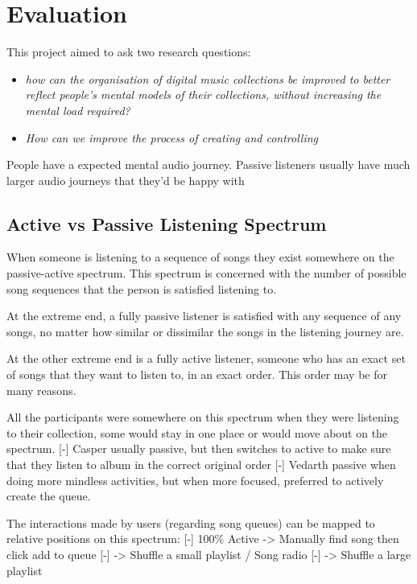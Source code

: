 \chapter{Evaluation}
This project aimed to ask two research questions:\begin{itemize}
    \item \textit{how can the organisation of digital music collections be improved to better reflect people's mental models of their collections, without increasing the mental load required?}
    \item \textit{How can we improve the process of creating and controlling}
\end{itemize}

People have a expected mental audio journey. Passive listeners usually have much larger audio journeys that they'd be happy with

\section{Active vs Passive Listening Spectrum}
When someone is listening to a sequence of songs they exist somewhere on the passive-active spectrum. This spectrum is concerned with the number of possible song sequences that the person is satisfied listening to.

At the extreme end, a fully passive listener is satisfied with any sequence of any songs, no matter how similar or dissimilar the songs in the listening journey are.

At the other extreme end is a fully active listener, someone who has an exact set of songs that they want to listen to, in an exact order. This order may be for many reasons.

All the participants were somewhere on this spectrum when they were listening to their collection, some would stay in one place or would move about on the spectrum.
[-] Casper usually passive, but then switches to active to make sure that they listen to album in the correct original order
[-] Vedarth passive when doing more mindless activities, but when more focused, preferred to actively create the queue.

The interactions made by users (regarding song queues) can be mapped to relative positions on this spectrum:
[-] 100\% Active -> Manually find song then click add to queue
[-] -> Shuffle a small playlist / Song radio
[-] -> Shuffle a large playlist

